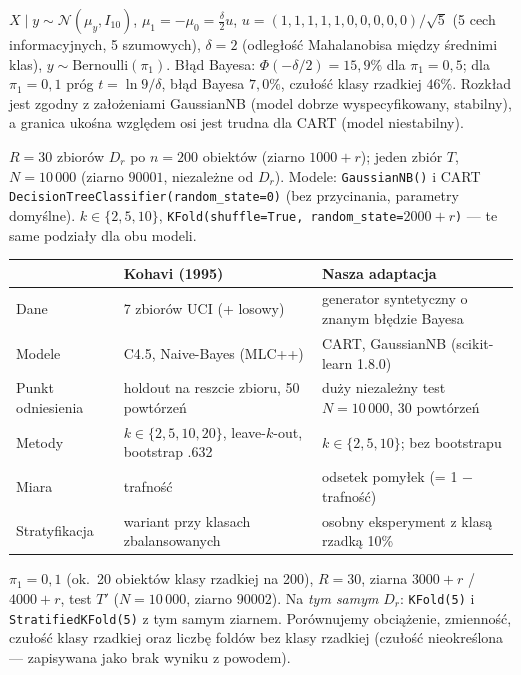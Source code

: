 \documentclass[10pt,a4paper]{article}
\newcommand{\hd}[1]{\par\vspace{0.55em}{\normalsize\bfseries #1}\par\vspace{0.1em}}
\begin{document}
\hd{3. Generator danych (utrwalony)}
$X\mid y \sim \mathcal N(\mu_y, I_{10})$, $\mu_1=-\mu_0=\tfrac{\delta}{2}u$, $u=(1,1,1,1,1,0,0,0,0,0)/\sqrt5$
(5 cech informacyjnych, 5 szumowych), $\delta=2$ (odległość Mahalanobisa między średnimi klas), $y\sim\text{Bernoulli}(\pi_1)$.
Błąd Bayesa: $\Phi(-\delta/2)=15{,}9\%$ dla $\pi_1=0{,}5$; dla $\pi_1=0{,}1$ próg $t=\ln 9/\delta$, błąd Bayesa $7{,}0\%$,
czułość klasy rzadkiej $46\%$. Rozkład jest zgodny z założeniami GaussianNB (model dobrze wyspecyfikowany, stabilny),
a granica ukośna względem osi jest trudna dla CART (model niestabilny).

\hd{4. Odtworzenie (adaptacja)}
$R=30$ zbiorów $D_r$ po $n=200$ obiektów (ziarno $1000+r$); jeden zbiór $T$, $N=10\,000$ (ziarno $90001$, niezależne od $D_r$).
Modele: \texttt{GaussianNB()} i CART \texttt{DecisionTreeClassifier(random\_state=0)} (bez przycinania, parametry domyślne).
$k\in\{2,5,10\}$, \texttt{KFold(shuffle=True, random\_state=}$2000+r$\texttt{)} --- te same podziały dla obu modeli.
\begin{center}\small
\begin{tabular}{@{}lll@{}}
\toprule
 & Kohavi (1995) & Nasza adaptacja \\
\midrule
Dane & 7 zbiorów UCI (+ losowy) & generator syntetyczny o znanym błędzie Bayesa \\
Modele & C4.5, Naive-Bayes (MLC++) & CART, GaussianNB (scikit-learn 1.8.0) \\
Punkt odniesienia & holdout na reszcie zbioru, 50 powtórzeń & duży niezależny test $N=10\,000$, 30 powtórzeń \\
Metody & $k\in\{2,5,10,20\}$, leave-$k$-out, bootstrap .632 & $k\in\{2,5,10\}$; bez bootstrapu \\
Miara & trafność & odsetek pomyłek (= 1 $-$ trafność) \\
Stratyfikacja & wariant przy klasach zbalansowanych & osobny eksperyment z klasą rzadką 10\% \\
\bottomrule
\end{tabular}
\end{center}

\hd{5. Eksperyment własny}
$\pi_1=0{,}1$ (ok.\ 20 obiektów klasy rzadkiej na 200), $R=30$, ziarna $3000+r$ / $4000+r$, test $T'$ ($N=10\,000$, ziarno $90002$).
Na \emph{tym samym} $D_r$: \texttt{KFold(5)} i \texttt{StratifiedKFold(5)} z tym samym ziarnem. Porównujemy obciążenie, zmienność,
czułość klasy rzadkiej oraz liczbę foldów bez klasy rzadkiej (czułość nieokreślona --- zapisywana jako brak wyniku z powodem).
\end{document}
